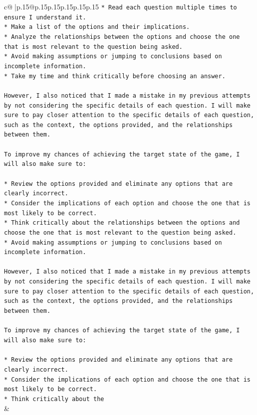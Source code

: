 \documentclass{article}
\begin{document}
{\begin{supertabular}{c@{$\;$}|p{.15\linewidth}@{}p{.15\linewidth}p{.15\linewidth}p{.15\linewidth}p{.15\linewidth}p{.15\linewidth}}
{{{\texttt{* Read each question multiple times to ensure I understand it.} \\
\texttt{* Make a list of the options and their implications.} \\
\texttt{* Analyze the relationships between the options and choose the one that is most relevant to the question being asked.} \\
\texttt{* Avoid making assumptions or jumping to conclusions based on incomplete information.} \\
\texttt{* Take my time and think critically before choosing an answer.} \\
\\ 
\texttt{However, I also noticed that I made a mistake in my previous attempts by not considering the specific details of each question. I will make sure to pay closer attention to the specific details of each question, such as the context, the options provided, and the relationships between them.} \\
\\ 
\texttt{To improve my chances of achieving the target state of the game, I will also make sure to:} \\
\\ 
\texttt{* Review the options provided and eliminate any options that are clearly incorrect.} \\
\texttt{* Consider the implications of each option and choose the one that is most likely to be correct.} \\
\texttt{* Think critically about the relationships between the options and choose the one that is most relevant to the question being asked.} \\
\texttt{* Avoid making assumptions or jumping to conclusions based on incomplete information.} \\
\\ 
\texttt{However, I also noticed that I made a mistake in my previous attempts by not considering the specific details of each question. I will make sure to pay closer attention to the specific details of each question, such as the context, the options provided, and the relationships between them.} \\
\\ 
\texttt{To improve my chances of achieving the target state of the game, I will also make sure to:} \\
\\ 
\texttt{* Review the options provided and eliminate any options that are clearly incorrect.} \\
\texttt{* Consider the implications of each option and choose the one that is most likely to be correct.} \\
\texttt{* Think critically about the} \\
            }
        }
    }
    & \\ \\

\end{supertabular}
}
\end{document}
